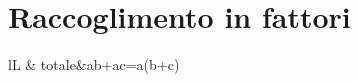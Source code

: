 \chapter{Raccoglimento in fattori}
\label{cha:raccoglimentoinfattori}
\minitoc
\mtcskip                                %
\minilof                                %
\mtcskip                                %
\minilot
\begin{table}
\centering
\begin{tabular}{lL}
\toprule
{}
\midtilde
{}&
\midrule
totale&ab+ac=a(b+c)\\
\multirow


\end{tabular}
\end{table}

